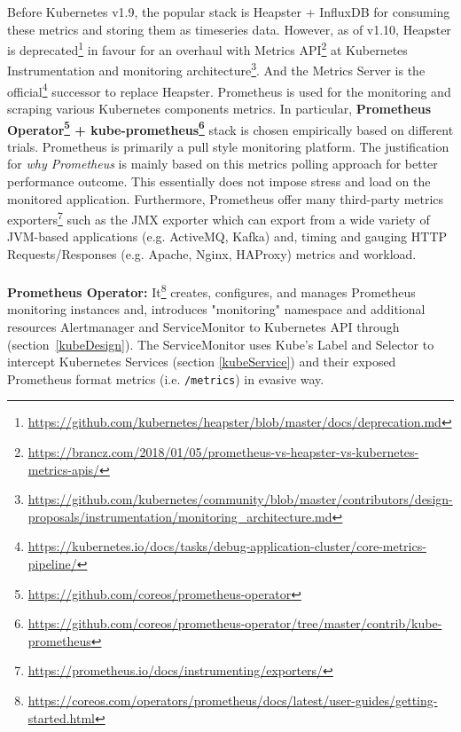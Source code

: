 Before Kubernetes v1.9, the popular stack is Heapster + InfluxDB for consuming these metrics and storing them as timeseries data. However, as of v1.10, Heapster is deprecated\footnote{\url{https://github.com/kubernetes/heapster/blob/master/docs/deprecation.md}} in favour for an overhaul with Metrics API\footnote{\url{https://brancz.com/2018/01/05/prometheus-vs-heapster-vs-kubernetes-metrics-apis/}} at Kubernetes Instrumentation and monitoring architecture\footnote{\url{https://github.com/kubernetes/community/blob/master/contributors/design-proposals/instrumentation/monitoring_architecture.md}}. And the Metrics Server is the official\footnote{\url{https://kubernetes.io/docs/tasks/debug-application-cluster/core-metrics-pipeline/}} successor to replace Heapster. Prometheus is used for the monitoring and scraping various Kubernetes components metrics. In particular, \textbf{Prometheus Operator\footnote{\url{https://github.com/coreos/prometheus-operator}} + kube-prometheus\footnote{\url{https://github.com/coreos/prometheus-operator/tree/master/contrib/kube-prometheus}}} stack  is chosen empirically based on different trials. Prometheus is primarily a pull style monitoring platform. The justification for \textit{why Prometheus} is mainly based on this metrics polling approach for better performance outcome. This essentially does not impose stress and load on the monitored application. Furthermore, Prometheus offer many third-party metrics exporters\footnote{\url{https://prometheus.io/docs/instrumenting/exporters/}} such as the JMX exporter which can export from a wide variety of JVM-based applications (e.g. ActiveMQ, Kafka) and, timing and gauging HTTP Requests/Responses (e.g. Apache, Nginx, HAProxy) metrics and workload.
\\
\\
\noindent \textbf{Prometheus Operator:} \quad It\footnote{\url{https://coreos.com/operators/prometheus/docs/latest/user-guides/getting-started.html}} creates, configures, and manages Prometheus monitoring instances and, introduces "monitoring" namespace and additional resources Alertmanager and ServiceMonitor to Kubernetes API through  (section~\ref{kubeDesign}). The ServiceMonitor uses Kube's Label and Selector to intercept Kubernetes Services (section \ref{kubeService}) and their exposed Prometheus format metrics (i.e. \verb|/metrics|) in evasive way.

